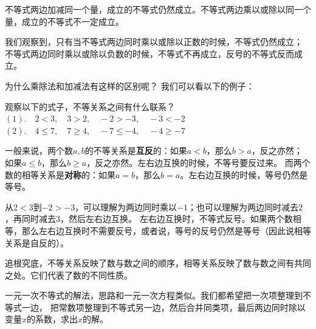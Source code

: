 \documentclass[12pt,UTF8,fontset=none]{ctexbook}
\begin{document}
不等式两边加减同一个量，成立的不等式仍然成立。不等式两边乘以或除以同一个量，成立的不等式不一定成立。

我们观察到，只有当不等式两边同时乘以或除以正数的时候，不等式仍然成立；
不等式两边同时乘以或除以负数的时候，不等式不再成立，反号的不等式反而成立。

为什么乘除法和加减法有这样的区别呢？
我们可以看以下的例子：
\begin{ex}\label{ex:4-1-20}
    观察以下的式子，不等关系之间有什么联系？\\
    $(1).\quad 2 < 3, \quad 3 > 2, \quad -2 > -3, \quad -3 < -2$ \\
    $(2). \quad 4 \leqslant 7, \quad 7 \geqslant 4, \quad -7 \leqslant -4, \quad -4 \geqslant -7$
\end{ex}
一般来说，两个数$a,b$的不等关系是\textbf{互反}的：如果$a < b$，那么$b > a$，反之亦然；
如果$a \leqslant b$，那么$b \geqslant a$，反之亦然。左右边互换的时候，不等号要反过来。
而两个数的相等关系是\textbf{对称}的：如果$a = b$，那么$b = a$。左右边互换的时候，等号仍然是等号。

从$2 < 3$到$-2 > -3$，可以理解为两边同时乘以$-1$；也可以理解为两边同时减去$2$，再同时减去$3$，然后左右边互换。
左右边互换时，不等式反号。如果两个数相等，那么左右边互换时不需要反号，或者说，等号的反号仍然是等号（因此说相等关系是自反的）。

追根究底，不等关系反映了数与数之间的顺序，相等关系反映了数与数之间有共同之处。它们代表了数的不同性质。

一元一次不等式的解法，思路和一元一次方程类似。我们都希望把一次项整理到不等式一边，
把常数项整理到不等式另一边，然后合并同类项，最后两边同时除以变量$x$的系数，求出$x$的解。
\end{document}
